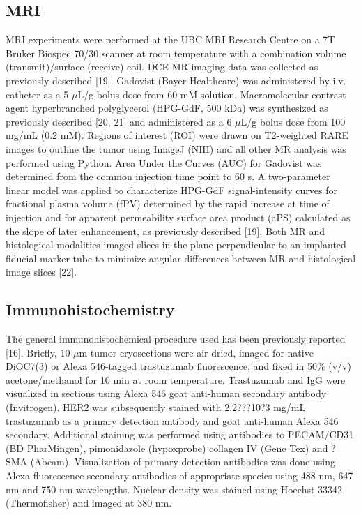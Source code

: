 \subsection{MRI}
MRI experiments were performed at the UBC MRI Research Centre on a 7T Bruker Biospec 70/30 scanner at room temperature with a combination volume (transmit)/surface (receive) coil.
DCE-MR imaging data was collected as previously described [19].
Gadovist (Bayer Healthcare) was administered by i.v.
catheter as a 5 $\mu$L/g bolus dose from 60 mM solution.
Macromolecular contrast agent hyperbranched polyglycerol (HPG-GdF, 500 kDa) was synthesized as previously described [20, 21] and administered as a 6 $\mu$L/g bolus dose from 100 mg/mL (0.2 mM).
Regions of interest (ROI) were drawn on T2-weighted RARE images to outline the tumor using ImageJ (NIH) and all other MR analysis was performed using Python.
Area Under the Curves (AUC) for Gadovist was determined from the common injection time point to 60 s.
A two-parameter linear model was applied to characterize HPG-GdF signal-intensity curves for fractional plasma volume (fPV) determined by the rapid increase at time of injection and for apparent permeability surface area product (aPS) calculated as the slope of later enhancement, as previously described [19].
Both MR and histological modalities imaged slices in the plane perpendicular to an implanted fiducial marker tube to minimize angular differences between MR and histological image slices [22].

\subsection{Immunohistochemistry}
The general immunohistochemical procedure used has been previously reported [16].
Briefly, 10 $\mu$m tumor cryosections were air-dried, imaged for native DiOC7(3) or Alexa 546-tagged trastuzumab fluorescence, and fixed in 50\% (v/v) acetone/methanol for 10 min at room temperature.
Trastuzumab and IgG were visualized in sections using Alexa 546 goat anti-human secondary antibody (Invitrogen).
HER2 was subsequently stained with 2.2???10?3 mg/mL trastuzumab as a primary detection antibody and goat anti-human Alexa 546 secondary.
Additional staining was performed using antibodies to PECAM/CD31 (BD PharMingen), pimonidazole (hypoxprobe) collagen IV (Gene Tex) and ?SMA (Abcam).
Visualization of primary detection antibodies was done using Alexa fluorescence secondary antibodies of appropriate species using 488 nm, 647 nm and 750 nm wavelengths.
Nuclear density was stained using Hoechst 33342 (Thermofisher) and imaged at 380 nm.

